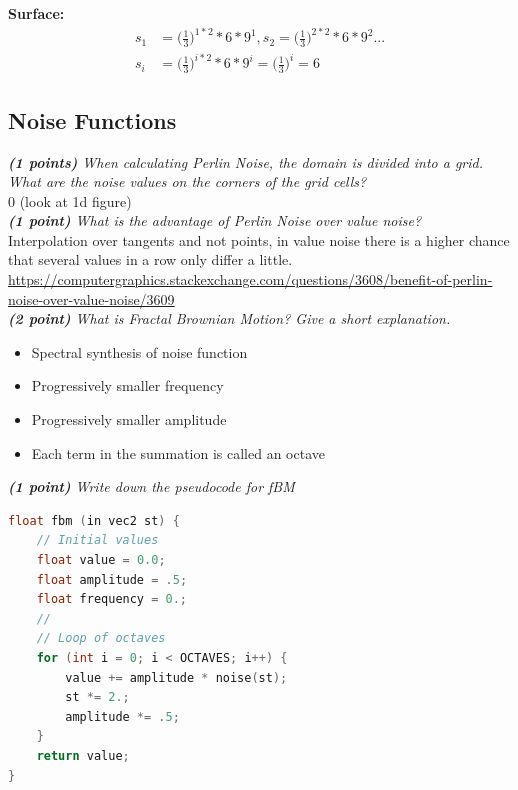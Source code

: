 \documentclass[a4paper,10pt]{article}
\begin{document}
\textbf{Surface:}
\[
\begin{aligned}
s_1&=\Big(\frac{1}{3}\Big)^{1*2}*6*9^1,s_2=\Big(\frac{1}{3}\Big)^{2*2}*6*9^2...\\
s_i&=\Big(\frac{1}{3}\Big)^{i*2}*6*9^i=\Big(\frac{1}{3}\Big)^{i}=6
\end{aligned}
\]
\subsection{Noise Functions}
\textit{\textbf{(1 points)} When calculating Perlin Noise, the domain is divided into a grid. What are the noise values on the corners of the grid cells?}\\

0 (look at 1d figure)\\

\textit{\textbf{(1 point)} What is the advantage of Perlin Noise over value noise?}\\

Interpolation over tangents and not points, in value noise there is a higher chance that several values in a row
only differ a little. \\

\url{https://computergraphics.stackexchange.com/questions/3608/benefit-of-perlin-noise-over-value-noise/3609}\\

\textit{\textbf{(2 point)} What is Fractal Brownian Motion? Give a short explanation.}

 \begin{itemize}
 	\item Spectral synthesis of noise function
 	\item Progressively smaller frequency
 	\item Progressively smaller amplitude
 	\item Each term in the summation is called an octave
 \end{itemize}
\textit{\textbf{(1 point)} Write down the pseudocode for fBM}
\begin{lstlisting}[language=C]
float fbm (in vec2 st) {
	// Initial values
	float value = 0.0;
	float amplitude = .5;
	float frequency = 0.;
	//
	// Loop of octaves
	for (int i = 0; i < OCTAVES; i++) {
		value += amplitude * noise(st);
		st *= 2.;
		amplitude *= .5;
	}
	return value;
}
\end{lstlisting}
\end{document}

